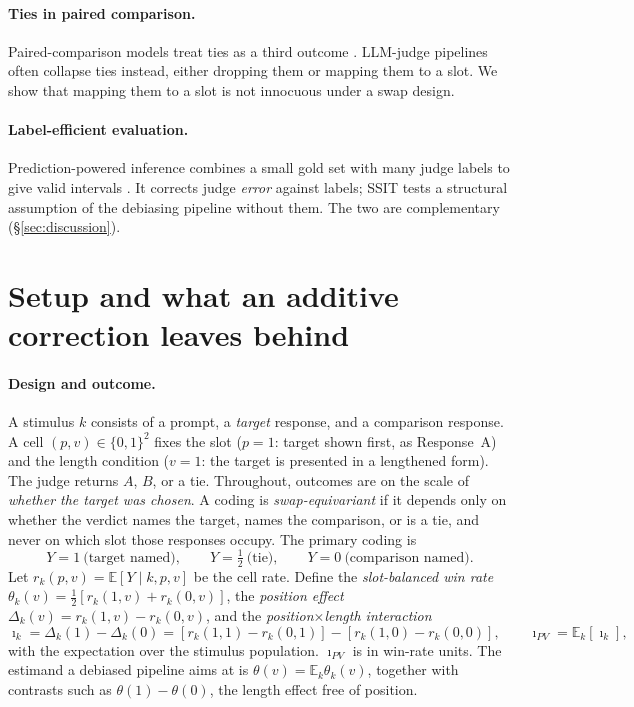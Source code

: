 \documentclass[10pt]{article}
\theoremstyle{remark}
\newcommand{\iPV}{\imath_{PV}}
\newcommand{\E}{\mathbb{E}}
\begin{document}
\paragraph{Ties in paired comparison.}
Paired-comparison models treat ties as a third outcome
\citep{rao1967ties,davidson1970ties}. LLM-judge pipelines often collapse
ties instead, either dropping them or mapping them to a slot. We show
that mapping them to a slot is not innocuous under a swap design.

\paragraph{Label-efficient evaluation.}
Prediction-powered inference combines a small gold set with many judge
labels to give valid intervals
\citep{angelopoulos2023ppi,angelopoulos2024ppipp,chen2026eif}. It
corrects judge \emph{error} against labels; SSIT tests a structural
assumption of the debiasing pipeline without them. The two are
complementary (\S\ref{sec:discussion}).

\section{Setup and what an additive correction leaves behind}
\label{sec:theory}

\paragraph{Design and outcome.}
A stimulus $k$ consists of a prompt, a \emph{target} response, and a
comparison response. A cell $(p,v)\in\{0,1\}^2$ fixes the slot
($p{=}1$: target shown first, as Response~A) and the length condition
($v{=}1$: the target is presented in a lengthened form). The judge
returns $A$, $B$, or a tie. Throughout, outcomes are on the scale of
\emph{whether the target was chosen}. A coding is
\emph{swap-equivariant} if it depends only on whether the verdict names
the target, names the comparison, or is a tie, and never on which slot
those responses occupy. The primary coding is
\begin{equation}
  Y = 1\ \text{(target named)},\qquad Y=\tfrac12\ \text{(tie)},\qquad Y = 0\ \text{(comparison named)}.
  \label{eq:coding}
\end{equation}
Let $r_k(p,v)=\E[Y\mid k,p,v]$ be the cell rate. Define the
\emph{slot-balanced win rate} $\theta_k(v)=\tfrac12[r_k(1,v)+r_k(0,v)]$,
the \emph{position effect}
$\Delta_k(v)=r_k(1,v)-r_k(0,v)$, and the \emph{position$\times$length
interaction}
\begin{equation}
  \imath_k=\Delta_k(1)-\Delta_k(0)
  =[r_k(1,1)-r_k(0,1)]-[r_k(1,0)-r_k(0,0)],\qquad
  \iPV=\E_k[\imath_k],
  \label{eq:ipv}
\end{equation}
with the expectation over the stimulus population. $\iPV$ is in
win-rate units. The estimand a debiased pipeline aims at is
$\theta(v)=\E_k\theta_k(v)$, together with contrasts such as
$\theta(1)-\theta(0)$, the length effect free of position.
\end{document}
